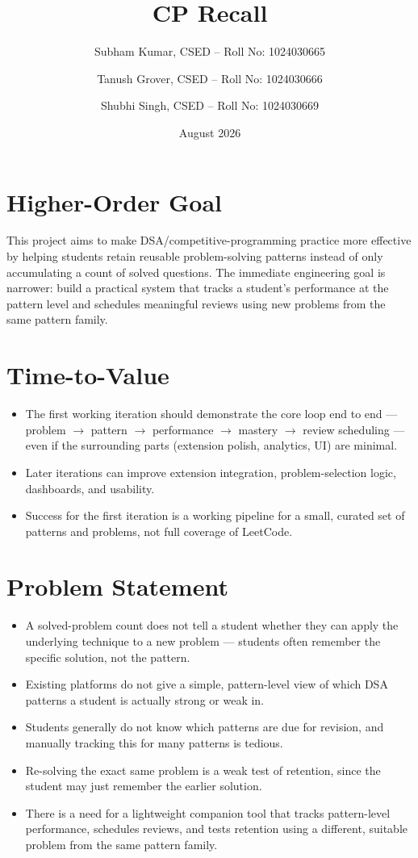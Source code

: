 \documentclass[11pt,a4paper]{article}
\title{CP Recall}
\author{
Subham Kumar, CSED -- Roll No: 1024030665
\and
Tanush Grover, CSED -- Roll No: 1024030666
\and
Shubhi Singh, CSED -- Roll No: 1024030669
}
\date{August 2026}
\begin{document}
\maketitle

\section{Higher-Order Goal}
This project aims to make DSA/competitive-programming practice more effective by helping students retain reusable problem-solving patterns instead of only accumulating a count of solved questions. The immediate engineering goal is narrower: build a practical system that tracks a student's performance at the pattern level and schedules meaningful reviews using new problems from the same pattern family.

\section{Time-to-Value}
\begin{itemize}[leftmargin=0.7cm]
\item The first working iteration should demonstrate the core loop end to end --- problem $\rightarrow$ pattern $\rightarrow$ performance $\rightarrow$ mastery $\rightarrow$ review scheduling --- even if the surrounding parts (extension polish, analytics, UI) are minimal.
\item Later iterations can improve extension integration, problem-selection logic, dashboards, and usability.
\item Success for the first iteration is a working pipeline for a small, curated set of patterns and problems, not full coverage of LeetCode.
\end{itemize}

\section{Problem Statement}
\begin{itemize}[leftmargin=0.7cm]
\item A solved-problem count does not tell a student whether they can apply the underlying technique to a new problem --- students often remember the specific solution, not the pattern.
\item Existing platforms do not give a simple, pattern-level view of which DSA patterns a student is actually strong or weak in.
\item Students generally do not know which patterns are due for revision, and manually tracking this for many patterns is tedious.
\item Re-solving the exact same problem is a weak test of retention, since the student may just remember the earlier solution.
\item There is a need for a lightweight companion tool that tracks pattern-level performance, schedules reviews, and tests retention using a different, suitable problem from the same pattern family.
\end{itemize}
\end{document}
